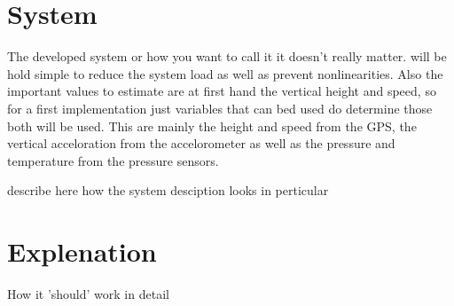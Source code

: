   \section{System}
  The developed system or how you want to call it it doesn't really matter.
  will be hold simple to reduce the system load as well as prevent nonlinearities.
  Also the important values to estimate are at first hand the vertical height and speed, so
  for a first implementation just variables that can bed used do determine those both will be used.
  This are mainly the height and speed from the GPS, the vertical acceloration from the accelorometer
  as well as the pressure and temperature from the pressure sensors.
  
  
  describe here how the system desciption looks in perticular 
  \section{Explenation}
  How it 'should' work in detail
  
